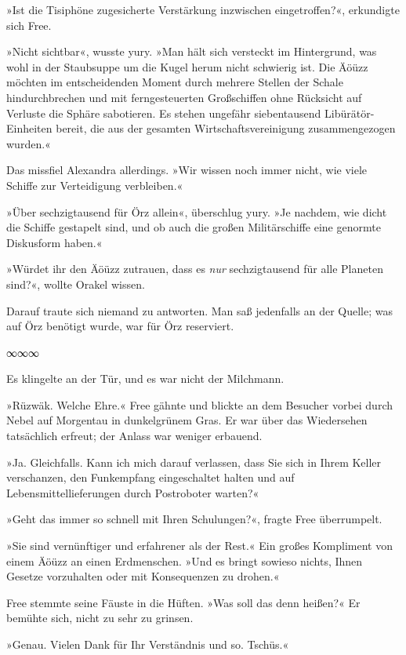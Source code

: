 »Ist die Tisiphöne zugesicherte Verstärkung inzwischen eingetroffen?«, erkundigte sich Free.

»Nicht sichtbar«, wusste yury. »Man hält sich versteckt im Hintergrund, was wohl in der Staubsuppe um die Kugel herum nicht schwierig ist. Die Äöüzz möchten im entscheidenden Moment durch mehrere Stellen der Schale hindurchbrechen und mit ferngesteuerten Großschiffen ohne Rücksicht auf Verluste die Sphäre sabotieren. Es stehen ungefähr siebentausend Libürätör-Einheiten bereit, die aus der gesamten Wirtschaftsvereinigung zusammengezogen wurden.«

Das missfiel Alexandra allerdings. »Wir wissen noch immer nicht, wie viele Schiffe zur Verteidigung verbleiben.«

»Über sechzigtausend für Örz allein«, überschlug yury. »Je nachdem, wie dicht die Schiffe gestapelt sind, und ob auch die großen Militärschiffe eine genormte Diskusform haben.«

»Würdet ihr den Äöüzz zutrauen, dass es \emph{nur} sechzigtausend für alle Planeten sind?«, wollte Orakel wissen.

Darauf traute sich niemand zu antworten. Man saß jedenfalls an der Quelle; was auf Örz benötigt wurde, war für Örz reserviert.

\begin{center}
∞∞∞
\end{center}

Es klingelte an der Tür, und es war nicht der Milchmann.

»Rüzwäk. Welche Ehre.« Free gähnte und blickte an dem Besucher vorbei durch Nebel auf Morgentau in dunkelgrünem Gras. Er war über das Wiedersehen tatsächlich erfreut; der Anlass war weniger erbauend.

»Ja. Gleichfalls. Kann ich mich darauf verlassen, dass Sie sich in Ihrem Keller verschanzen, den Funkempfang eingeschaltet halten und auf Lebensmittellieferungen durch Postroboter warten?«

»Geht das immer so schnell mit Ihren Schulungen?«, fragte Free überrumpelt.

»Sie sind vernünftiger und erfahrener als der Rest.« Ein großes Kompliment von einem Äöüzz an einen Erdmenschen. »Und es bringt sowieso nichts, Ihnen Gesetze vorzuhalten oder mit Konsequenzen zu drohen.«

Free stemmte seine Fäuste in die Hüften. »Was soll das denn heißen?« Er bemühte sich, nicht zu sehr zu grinsen.

»Genau. Vielen Dank für Ihr Verständnis und so. Tschüs.«

